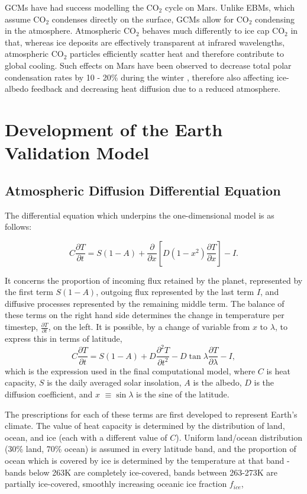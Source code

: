 \documentclass[12pt,onecolumn]{revtex4-2}    %
\begin{document}
GCMs have had success modelling the $\mathrm{CO_2}$ cycle on Mars. Unlike EBMs, which assume $\mathrm{CO_2}$ condenses directly on the surface, GCMs allow for $\mathrm{CO_2}$ condensing in the atmosphere. Atmospheric $\mathrm{CO_2}$ behaves much differently to ice cap $\mathrm{CO_2}$ in that, whereas ice deposits are effectively transparent at infrared wavelengths, atmospheric $\mathrm{CO_2}$ particles efficiently scatter heat and therefore contribute to global cooling. Such effects on Mars have been observed to decrease total polar condensation rates by 10 - 20\% during the winter \cite{FP96}, therefore also affecting ice-albedo feedback and decreasing heat diffusion due to a reduced atmosphere. 
 
\section{Development of the Earth Validation Model} 
\subsection{Atmospheric Diffusion Differential Equation}
The differential equation which underpins the one-dimensional model is as follows:

\begin{equation}
C \frac{\partial T}{\partial t} = S(1-A) + \frac{\partial}{\partial x} [D(1-x^{2})\frac{\partial T}{\partial x}] - I.
\end{equation}

It concerns the proportion of incoming flux retained by the planet, represented by the first term $S(1 - A)$, outgoing flux represented by the last term $I$, and diffusive processes represented by the remaining middle term. The balance of these terms on the right hand side determines the change in temperature per timestep, $\frac{\partial T}{\partial t}$, on the left. It is possible, by a change of variable from $x$ to $\lambda$, to express this in terms of latitude,
\begin{equation}
C \frac{\partial T}{\partial t} = S(1-A) + D\frac{\partial^2 T}{\partial t^2} - D\tan\lambda\frac{\partial T}{\partial \lambda} - I,
\end{equation}
which is the expression used in the final computational model, where $C$ is heat capacity, $S$ is the daily averaged solar insolation, $A$ is the albedo, $D$ is the diffusion coefficient, and $x$ $\equiv \sin\lambda$ is the sine of the latitude.

The prescriptions for each of these terms are first developed to represent Earth's climate. The value of heat capacity is determined by the distribution of land, ocean, and ice (each with a different value of $C$). Uniform land/ocean distribution (30\% land, 70\% ocean) is assumed in every latitude band, and the proportion of ocean which is covered by ice is determined by the temperature at that band - bands below 263K are completely ice-covered, bands between 263-273K are partially ice-covered, smoothly increasing oceanic ice fraction $f_{ice}$,
\end{document}
